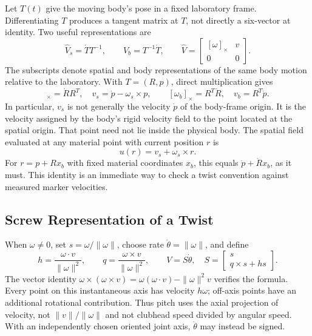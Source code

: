Let $T(t)$ give the moving body's pose in a fixed laboratory frame. Differentiating $T$ produces a tangent matrix at $T$, not directly a six-vector at identity. Two useful representations are
\begin{equation}
 \widehat V_s=\dot T T^{-1},\qquad \widehat V_b=T^{-1}\dot T,
 \qquad \widehat V=\begin{bmatrix}[\omega]_\times&v\\0&0\end{bmatrix}.
\end{equation}
\label{eq:se3_matrix}
\label{eq:twist_def}
The subscripts denote spatial and body representations of the same body motion relative to the laboratory. With $T=(R,p)$, direct multiplication gives
\begin{equation}
 [\omega_s]_\times=\dot R R^T,\quad v_s=\dot p-\omega_s\times p,
 \qquad [\omega_b]_\times=R^T\dot R,\quad v_b=R^T\dot p.
\end{equation}
In particular, $v_s$ is not generally the velocity $\dot p$ of the body-frame origin. It is the velocity assigned by the body's rigid velocity field to the point located at the spatial origin. That point need not lie inside the physical body. The spatial field evaluated at any material point with current position $r$ is
\begin{equation}
 u(r)=v_s+\omega_s\times r.
\end{equation}
For $r=p+Rx_b$ with fixed material coordinates $x_b$, this equals $\dot p+\dot R x_b$, as it must. This identity is an immediate way to check a twist convention against measured marker velocities.

\subsection{Screw Representation of a Twist}

When $\omega\ne0$, set $s=\omega/\|\omega\|$, choose rate $\dot\theta=\|\omega\|$, and define
\begin{equation}
 h=\frac{\omega\cdot v}{\|\omega\|^2},\qquad
 q=\frac{\omega\times v}{\|\omega\|^2},\qquad
 V=S\dot\theta,\quad S=\begin{bmatrix}s\\q\times s+hs\end{bmatrix}.
\end{equation}
\label{eq:screw_coordinates}
The vector identity $\omega\times(\omega\times v)=\omega(\omega\cdot v)-\|\omega\|^2v$ verifies the formula. Every point on this instantaneous axis has velocity $h\omega$; off-axis points have an additional rotational contribution. Thus pitch uses the axial projection of velocity, not $\|v\|/\|\omega\|$ and not clubhead speed divided by angular speed. With an independently chosen oriented joint axis, $\dot\theta$ may instead be signed.

